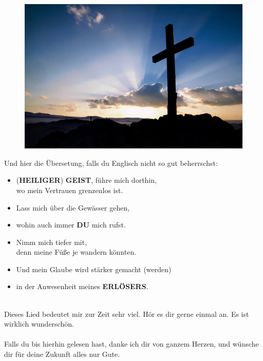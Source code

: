\documentclass[12pt,a5paper]{article}
\newcommand{\Du}[0]{\textbf{DU}}
\newcommand{\Erloesers}[0]{\textbf{ERL\"OSERS}}
\newcommand{\Geist}[0]{\textbf{GEIST}}
\newcommand{\Heiliger}[0]{\textbf{HEILIGER}}
\begin{document}
		\begin{figure}[h]
			\centering
			\includegraphics[width=\linewidth,keepaspectratio]{"FreeChristian.jpeg"}
		\end{figure}
		
		\newpage
		Und hier die \"Ubersetung,
		falls du Englisch nicht so gut beherrschst:
		\\
		\begin{itemize}[nosep]
			\item[]	({\Heiliger}) {\Geist},
					f\"uhre mich dorthin,
					\\
					wo mein Vertrauen grenzenlos ist.
			\item[]	Lass mich \"uber die Gew\"asser gehen,
			\item[] wohin auch immer {\Du} mich rufst.
			\item[]	Nimm mich tiefer mit,
					\\
					denn meine F\"u{\ss}e je wandern k\"onnten.
			\item[]	Und mein Glaube wird st\"arker gemacht (werden)
			\item[]	in der Anwesenheit meines {\Erloesers}.
					\\
					\\
		\end{itemize}
		Dieses Lied bedeutet mir zur Zeit sehr viel.
		H\"or es dir gerne einmal an.
		Es ist wirklich wundersch\"on.
		\\
		\\
		Falls du bis hierhin gelesen hast,
		danke ich dir von ganzem Herzen,
		und w\"unsche dir f\"ur deine Zukunft alles nur Gute.
\end{document}

